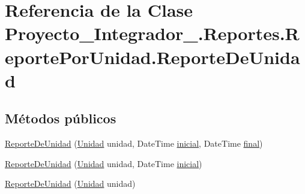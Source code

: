 \hypertarget{class_proyecto___integrador__3_1_1_reportes_1_1_reporte_por_unidad_1_1_reporte_de_unidad}{\section{Referencia de la Clase Proyecto\-\_\-\-Integrador\-\_.\-Reportes.\-Reporte\-Por\-Unidad.\-Reporte\-De\-Unidad}
\label{class_proyecto___integrador__3_1_1_reportes_1_1_reporte_por_unidad_1_1_reporte_de_unidad}
}
\subsection*{Métodos públicos}
\begin{DoxyCompactItemize}
\item 
\hyperlink{class_proyecto___integrador__3_1_1_reportes_1_1_reporte_por_unidad_1_1_reporte_de_unidad_a25b2af179a4601db1a2129d8200e7eee}{Reporte\-De\-Unidad} (\hyperlink{class_proyecto___integrador__3_1_1_tipos_dato_1_1_unidad}{Unidad} unidad, Date\-Time \hyperlink{class_proyecto___integrador__3_1_1_reportes_1_1_reporte_por_unidad_a580b30fc38c300431b3827dd370c794b}{inicial}, Date\-Time \hyperlink{class_proyecto___integrador__3_1_1_reportes_1_1_reporte_por_unidad_a1f1ef326bff361e8fad3182f10c5da2f}{final})
\item 
\hyperlink{class_proyecto___integrador__3_1_1_reportes_1_1_reporte_por_unidad_1_1_reporte_de_unidad_a91a1d773085fef47d41042be0162a587}{Reporte\-De\-Unidad} (\hyperlink{class_proyecto___integrador__3_1_1_tipos_dato_1_1_unidad}{Unidad} unidad, Date\-Time \hyperlink{class_proyecto___integrador__3_1_1_reportes_1_1_reporte_por_unidad_a580b30fc38c300431b3827dd370c794b}{inicial})
\item 
\hyperlink{class_proyecto___integrador__3_1_1_reportes_1_1_reporte_por_unidad_1_1_reporte_de_unidad_a128dcb976c1c91cfcc1311c21fc7fa7a}{Reporte\-De\-Unidad} (\hyperlink{class_proyecto___integrador__3_1_1_tipos_dato_1_1_unidad}{Unidad} unidad)
\end{DoxyCompactItemize}
